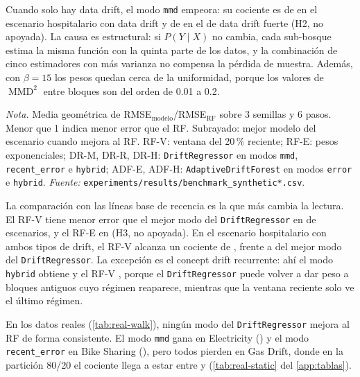 \documentclass[11pt,a4paper]{article}
\newcommand{\MMD}{\operatorname{MMD}}
\newcommand{\nota}[1]{\par\smallskip\raggedright\footnotesize\textit{Nota.} #1}
\begin{document}
Cuando solo hay data drift, el modo \texttt{mmd} empeora: su cociente es de \hDosMin{} en el escenario
hospitalario con data drift y de \hDosMax{} en el de data drift fuerte (H2, no apoyada). La causa es
estructural: si $P(Y\mid X)$ no cambia, cada sub-bosque estima la misma función con la quinta parte
de los datos, y la combinación de cinco estimadores con más varianza no compensa la pérdida de
muestra. Además, con $\beta=15$ los pesos quedan cerca de la uniformidad, porque los valores de
$\MMD^2$ entre bloques son del orden de 0.01 a 0.2.

\begin{table}[htbp]
  \centering
  \caption{Cociente de RMSE respecto al RF convencional, escenarios sintéticos, walk-forward}\label{tab:sint-walk}
  \small
  
  \nota{Media geométrica de RMSE$_{\text{modelo}}$/RMSE$_{\text{RF}}$ sobre 3 semillas y 6 pasos.
  Menor que 1 indica menor error que el RF. Subrayado: mejor modelo del escenario cuando mejora al RF.
  RF-V: ventana del 20\,\% reciente; RF-E: pesos exponenciales; DR-M, DR-R, DR-H:
  \texttt{DriftRegressor} en modos \texttt{mmd}, \texttt{recent\_error} e \texttt{hybrid}; ADF-E,
  ADF-H: \texttt{AdaptiveDriftForest} en modos \texttt{error} e \texttt{hybrid}. \textit{Fuente:}
  \texttt{experiments/results/benchmark\_synthetic*.csv}.}
\end{table}

La comparación con las líneas base de recencia es la que más cambia la lectura. El RF-V tiene menor
error que el mejor modo del \texttt{DriftRegressor} en \hTresRFV{} de \hTresN{} escenarios, y el RF-E
en \hTresRFE{} (H3, no apoyada). En el escenario hospitalario con ambos tipos de drift, el RF-V
alcanza un cociente de \xRFVHealthcareBothWalk{}, frente a \xDRrHealthcareBothWalk{} del mejor modo
del \texttt{DriftRegressor}. La excepción es el concept drift recurrente: ahí el modo
\texttt{hybrid} obtiene \xDRhFriedmanRecurringWalk{} y el RF-V \xRFVFriedmanRecurringWalk{}, porque
el \texttt{DriftRegressor} puede volver a dar peso a bloques antiguos cuyo régimen reaparece,
mientras que la ventana reciente solo ve el último régimen.

En los datos reales (\cref{tab:real-walk}), ningún modo del \texttt{DriftRegressor} mejora al RF de
forma consistente. El modo \texttt{mmd} gana en Electricity (\xDRmElectricityWalk) y el modo
\texttt{recent\_error} en Bike Sharing (\xDRrBikeSharingWalk), pero todos pierden en Gas Drift, donde
en la partición 80/20 el cociente llega a estar entre \gasDRmin{} y \gasDRmax{}
(\cref{tab:real-static} del \cref{app:tablas}).
\end{document}
